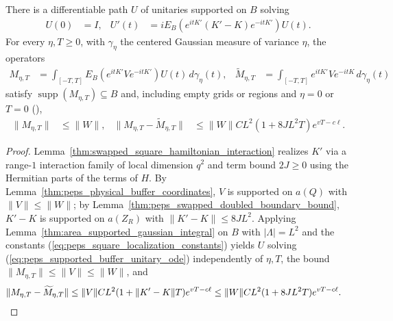 \begin{lemma}
    There is a differentiable path $U$ of unitaries supported on $B$ solving
    \begin{align}
        U(0)  & =I,                                 &
        U'(t) & =iE_B(e^{itK'}(K'-K)e^{-itK'})U(t).
        \label{eq:peps_supported_buffer_unitary_ode}
    \end{align}
    For every $\eta,T\ge0$, with $\gamma_\eta$ the centered Gaussian measure of
    variance $\eta$, the operators
    \begin{align}
        M_{\eta,T}
         & =\int_{[-T,T]}E_B(e^{itK'}Ve^{-itK'})U(t)\,d\gamma_\eta(t), &
        \widetilde M_{\eta,T}
         & =\int_{[-T,T]}e^{itK'}Ve^{-itK}\,d\gamma_\eta(t)
        \label{eq:peps_supported_buffer_integrals}
    \end{align}
    satisfy $\operatorname{supp}(M_{\eta,T})\subseteq B$ and, including empty
    grids or regions and $\eta=0$ or $T=0$
    (\cite{OpenAI2026PolynomialPEPS}),
    \begin{align}
        \|M_{\eta,T}\| & \le\|W\|,                           &
        \|M_{\eta,T}-\widetilde M_{\eta,T}\|
                       & \le\|W\|CL^2(1+8JL^2T)e^{vT-c\ell}.
        \label{eq:peps_supported_buffer_bounds}
    \end{align}
\end{lemma}
\begin{proof}
    \leanok
    Lemma~\ref{thm:swapped_square_hamiltonian_interaction} realizes $K'$ via
    a range-$1$ interaction family of local dimension $q^2$ and term bound
    $2J\ge0$ using the Hermitian parts of the terms of $H$. By
    Lemma~\ref{thm:peps_physical_buffer_coordinates}, $V$ is supported on
    $a(Q)$ with $\|V\|\le\|W\|$; by
    Lemma~\ref{thm:peps_swapped_doubled_boundary_bound}, $K'-K$ is supported
    on $a(Z_R)$ with $\|K'-K\|\le8JL^2$. Applying
    Lemma~\ref{thm:area_supported_gaussian_integral} on $B$ with $|\Lambda|=L^2$
    and the constants (\ref{eq:peps_square_localization_constants}) yields $U$
    solving (\ref{eq:peps_supported_buffer_unitary_ode}) independently of
    $\eta,T$, the bound $\|M_{\eta,T}\|\le\|V\|\le\|W\|$, and
    \begin{align}
        \|M_{\eta,T}-\widetilde M_{\eta,T}\|
         & \le\|V\|CL^2(1+\|K'-K\|T)e^{vT-c\ell}
        \le\|W\|CL^2(1+8JL^2T)e^{vT-c\ell}. \notag
    \end{align}
\end{proof}

